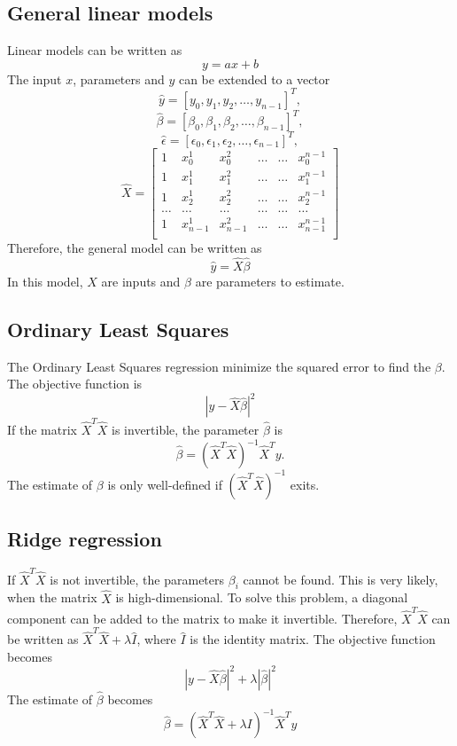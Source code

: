 \documentclass[a4paper]{article}
\begin{document}
\subsection{General linear models}
Linear models can be written as 
$$
y=ax+b
$$
The input $x$, parameters and $y$ can be extended to a vector
$$
\hat{y} = [y_0,y_1, y_2,\dots, y_{n-1}]^T,
$$
$$
\hat{\beta} = [\beta_0,\beta_1, \beta_2,\dots, \beta_{n-1}]^T,
$$
$$
\hat{\epsilon} = [\epsilon_0,\epsilon_1, \epsilon_2,\dots, \epsilon_{n-1}]^T,
$$
$$
\hat{X}=
\begin{bmatrix} 
1& x_{0}^1 &x_{0}^2& \dots & \dots &x_{0}^{n-1}\\
1& x_{1}^1 &x_{1}^2& \dots & \dots &x_{1}^{n-1}\\
1& x_{2}^1 &x_{2}^2& \dots & \dots &x_{2}^{n-1}\\                      
\dots& \dots &\dots& \dots & \dots &\dots\\
1& x_{n-1}^1 &x_{n-1}^2& \dots & \dots &x_{n-1}^{n-1}\\
\end{bmatrix}
$$
 Therefore, the general model can be written as 
$$
\hat{y}= \hat{X}\hat{\beta}
$$
In this model, $X$ are inputs and $\beta$ are parameters to estimate.
\subsection{Ordinary Least Squares}
The Ordinary Least Squares regression minimize the squared error to find the $\beta$. The objective function is
$$
\left | y - \hat{X}\hat{\beta}  \right |^{2}
$$
If the matrix $\hat{X}^T\hat{X}$ is invertible, the parameter $\hat{\beta}$ is
$$
\hat{\beta} =\left(\hat{X}^T\hat{X}\right)^{-1}\hat{X}^{T}y.
$$
The estimate of $\beta$ is only well-defined if $(\hat{X}^{T}\hat{X})^{-1}$ exits. 
\subsection{Ridge regression}
If $\hat{X}^T\hat{X}$ is not invertible, the parameters $\beta_i$ cannot be found. This is very likely, when the matrix $\hat{X}$ is high-dimensional. To solve this problem, a  diagonal component can be added to the matrix to make it invertible. Therefore, $\hat{X}^{T} \hat{X}$ can be written as $\hat{X}^{T} \hat{X}+\lambda \hat{I}$, where $\hat{I}$ is the identity matrix. The objective function becomes
$$
\left |y - \hat{X}\hat{\beta}  \right |^{2} + \lambda \left | \hat{\beta}  \right |^{2}
$$
The estimate of  $\hat{\beta}$ becomes
$$
\hat{\beta} =\left(\hat{X}^T\hat{X}+\lambda I \right)^{-1} \hat{X}^{T}y
$$
\end{document}
